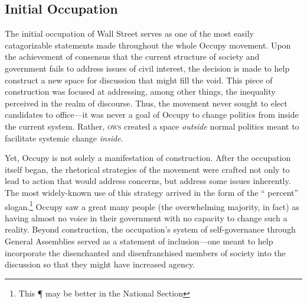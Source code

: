 \documentclass{article}
\begin{document}
\subsection{Initial Occupation}
The initial occupation of Wall Street serves as one of the most easily catagorizable statements made throughout the whole Occupy movement.
Upon the achievement of consensus that the current structure of society and government fails to address issues of civil interest, the decision is made to help construct a new space for discussion that might fill the void.
This piece of construction was focused at addressing, among other things, the inequality perceived in the realm of discourse.
Thus, the movement never sought to elect candidates to office---it was never a goal of Occupy to change politics from inside the current system.
Rather, \textsc{ows} created a space \emph{outside} normal politics meant to facilitate systemic change \emph{inside}.

Yet, Occupy is not solely a manifestation of construction.
After the occupation itself began, the rhetorical strategies of the movement were crafted not only to lead to action that would address concerns, but address some issues inherently.
The most widely-known use of this strategy arrived in the form of the `` percent'' slogan.\footnote{This ¶ may be better in the National Section}
Occupy saw a great many people (the overwhelming majority, in fact) as having almost no voice in their government with no capacity to change such a reality.
Beyond construction, the occupation's system of self-governance through General Assemblies served as a statement of inclusion---one meant to help incorporate the disenchanted and disenfranchised members of society into the discussion so that they might have increased agency.
\end{document}
